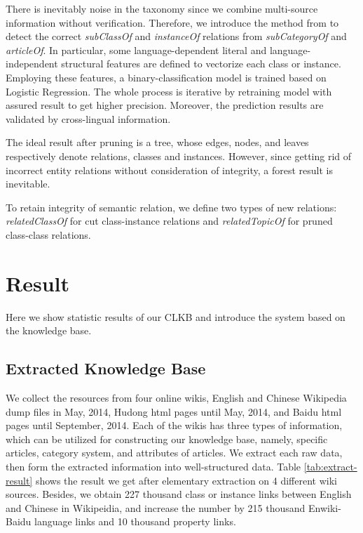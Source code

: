 \documentclass[runningheads,a4paper]{llncs}
\begin{document}
There is inevitably noise in the taxonomy since we combine multi-source information without verification. Therefore, we introduce the method from \cite{wang2014cross} to detect the correct \textit{subClassOf} and \textit{instanceOf} relations from \textit{subCategoryOf} and \textit{articleOf}. %
In particular, some language-dependent literal and language-independent structural features are defined to vectorize each class or instance. Employing these features, a binary-classification model is trained based on Logistic Regression. The whole process is iterative by retraining model with assured result to get higher precision. Moreover, the prediction results are validated by cross-lingual information.

The ideal result after pruning is a tree, whose edges, nodes, and leaves respectively denote relations, classes and instances. However, since getting rid of incorrect entity relations without consideration of integrity, a forest result is inevitable.

To retain integrity of semantic relation, we define two types of new relations: \textit{relatedClassOf} for cut class-instance relations and \textit{relatedTopicOf} for pruned class-class relations. 

\section{Result}
\label{sec:result}
Here we show statistic results of our CLKB and introduce the system based on the knowledge base.

\subsection{Extracted Knowledge Base}
We collect the resources from four online wikis, English and Chinese Wikipedia dump files in May, 2014, Hudong html pages until May, 2014, and Baidu html pages until September, 2014. Each of the wikis has three types of information, which can be utilized for constructing our knowledge base, namely, specific articles, category system, and attributes of articles. We extract each raw data, then form the extracted information into well-structured data. Table \ref{tab:extract-result} shows the result we get after elementary extraction on 4 different wiki sources. Besides, we obtain 227 thousand class or instance links between English and Chinese in Wikipeidia, and increase the number by 215 thousand Enwiki-Baidu language links and 10 thousand property links.
\end{document}
